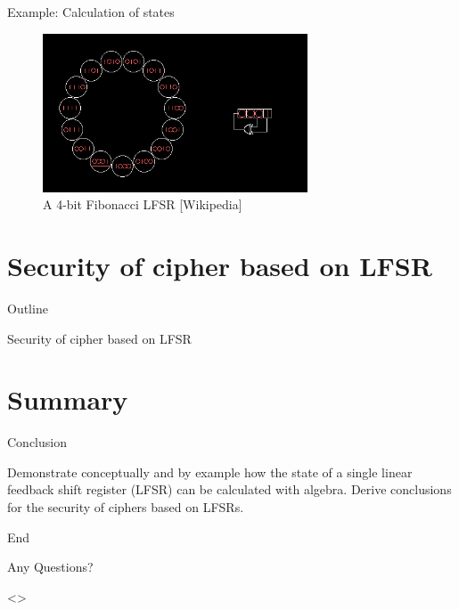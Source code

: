 \documentclass[]{beamer}
\DeclareRobustCommand{\mybox}[2][gray!20]{%
\begin{tcolorbox}[   %
        breakable,
        left=0pt,
        right=0pt,
        top=0pt,
        bottom=0pt,
        colback=#1,
        colframe=#1,
        width=\dimexpr\textwidth\relax, 
        enlarge left by=0mm,
        boxsep=5pt,
        arc=0pt,outer arc=0pt,
        ]
        #2
\end{tcolorbox}
}
\newcommand{\quest}[1]{\mybox{#1}}
\begin{document}
\begin{frame}[t]{Example: Calculation of states}
\begin{figure}[ht]
\centering
\includegraphics[width=0.7\textwidth]{example_lfsr.png}
\caption{A 4-bit Fibonacci LFSR [Wikipedia]}
\end{figure}
\end{frame}

\section{Security of cipher based on LFSR}
\begin{frame}[t]{Outline}
\tableofcontents[currentsection]
\end{frame}

\begin{frame}[t]{Security of cipher based on LFSR}
\begin{itemize}
\end{itemize}
\end{frame}


\section{Summary}
\begin{frame}[t]{Conclusion}
   \quest{
  \alert<3>{\alert<4>{Demonstrate} conceptually} and \alert<4>{by example \alert<3>{how the state of a \alert<2>{single linear feedback shift register (LFSR)} can be calculated with algebra.}} \alert<5>{Derive conclusions for the security of ciphers based on LFSRs}.
  }
\end{frame}

{}


\begin{frame}[t]{End}
  \begin{center} \LARGE{Any Questions?} \end{center}
  \only<>{
  \cite{Zenner-Erik}
  \cite{Paar-Christof}}
\end{frame}
\end{document}
